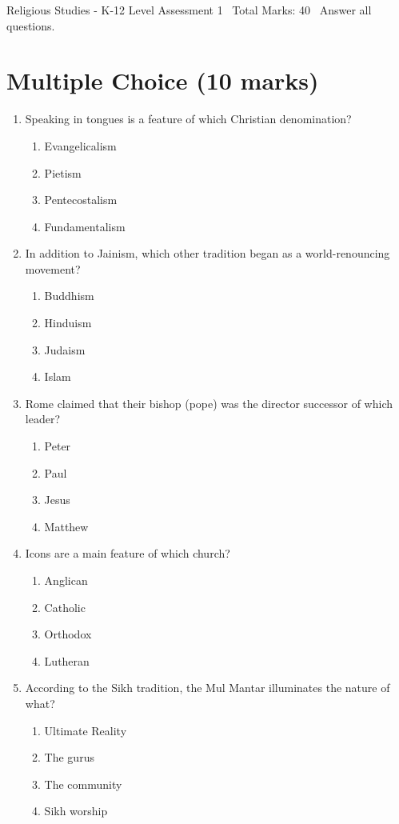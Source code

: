 \documentclass[12pt]{article}
\begin{document}
\begin{center}
Religious Studies - K-12 Level Assessment 1 \
Total Marks: 40 \
Answer all questions.
\end{center}

\section*{Multiple Choice (10 marks)}
\begin{enumerate}[label=\arabic*.]
\item Speaking in tongues is a feature of which Christian denomination?
\begin{enumerate}[label=(\alph*)]
    \item Evangelicalism
    \item Pietism
    \item Pentecostalism
    \item Fundamentalism
\end{enumerate}
\item In addition to Jainism, which other tradition began as a world-renouncing movement?
\begin{enumerate}[label=(\alph*)]
    \item Buddhism
    \item Hinduism
    \item Judaism
    \item Islam
\end{enumerate}
\item Rome claimed that their bishop (pope) was the director successor of which leader?
\begin{enumerate}[label=(\alph*)]
    \item Peter
    \item Paul
    \item Jesus
    \item Matthew
\end{enumerate}
\item Icons are a main feature of which church?
\begin{enumerate}[label=(\alph*)]
    \item Anglican
    \item Catholic
    \item Orthodox
    \item Lutheran
\end{enumerate}
\item According to the Sikh tradition, the Mul Mantar illuminates the nature of what?
\begin{enumerate}[label=(\alph*)]
    \item Ultimate Reality
    \item The gurus
    \item The community
    \item Sikh worship
\end{enumerate}
\end{enumerate}
\end{document}
